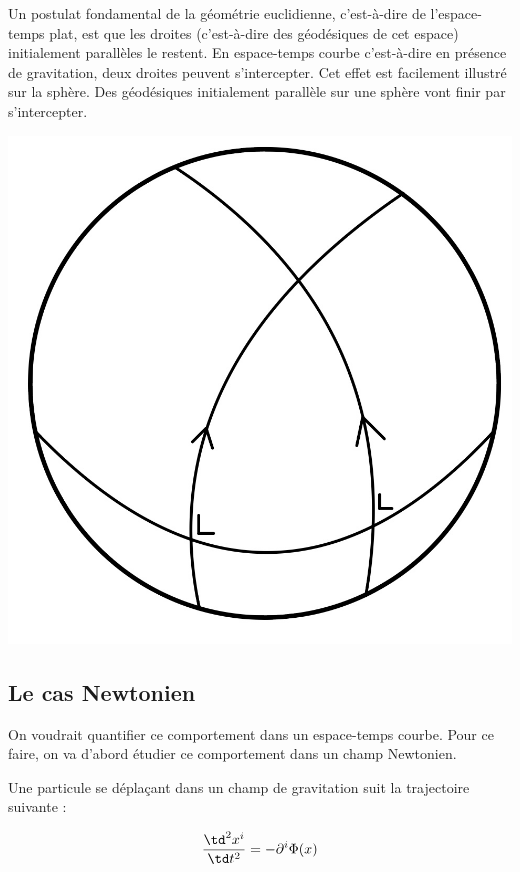 Un postulat fondamental de la géométrie euclidienne, c'est-à-dire de l'espace-temps plat, est que les droites (c'est-à-dire des géodésiques de cet espace) initialement parallèles le restent. En espace-temps courbe c'est-à-dire en présence de gravitation, deux droites peuvent s'intercepter. Cet effet est facilement illustré sur la sphère. Des géodésiques initialement parallèle sur une sphère vont finir par s'intercepter. 

\begin{center} \includegraphics[scale=0.15]{Chapitres/5. Géodésiques/Images/sphere trajectoire qui se croise.jpg} 
\end{center}

\subsection{Le cas Newtonien}
On voudrait quantifier ce comportement dans un espace-temps courbe. Pour ce faire, on va d'abord étudier ce comportement dans un champ Newtonien. 

Une particule se déplaçant dans un champ de gravitation suit la trajectoire suivante :

\begin{equation}
    \frac{\td^2x^{i}}{\td t^2} = -\partial^{i}\Phi(x)
\end{equation}

